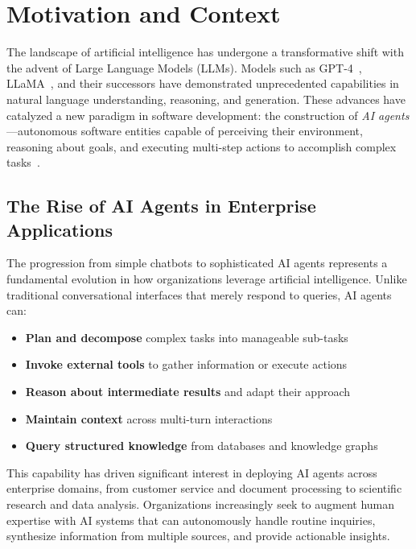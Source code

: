 
\section{Motivation and Context}
\label{sec:motivation}

The landscape of artificial intelligence has undergone a transformative shift with the advent of Large Language Models (LLMs). Models such as GPT-4~\cite{openai2023gpt4}, LLaMA~\cite{touvron2023llama}, and their successors have demonstrated unprecedented capabilities in natural language understanding, reasoning, and generation. These advances have catalyzed a new paradigm in software development: the construction of \emph{AI agents}---autonomous software entities capable of perceiving their environment, reasoning about goals, and executing multi-step actions to accomplish complex tasks~\cite{yao2022react}.

\subsection{The Rise of AI Agents in Enterprise Applications}

The progression from simple chatbots to sophisticated AI agents represents a fundamental evolution in how organizations leverage artificial intelligence. Unlike traditional conversational interfaces that merely respond to queries, AI agents can:

\begin{itemize}
    \item \textbf{Plan and decompose} complex tasks into manageable sub-tasks
    \item \textbf{Invoke external tools} to gather information or execute actions
    \item \textbf{Reason about intermediate results} and adapt their approach
    \item \textbf{Maintain context} across multi-turn interactions
    \item \textbf{Query structured knowledge} from databases and knowledge graphs
\end{itemize}

This capability has driven significant interest in deploying AI agents across enterprise domains, from customer service and document processing to scientific research and data analysis. Organizations increasingly seek to augment human expertise with AI systems that can autonomously handle routine inquiries, synthesize information from multiple sources, and provide actionable insights.

